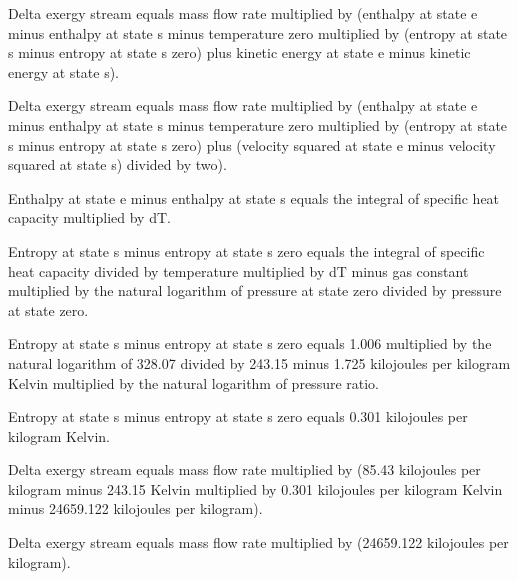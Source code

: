 Delta exergy stream equals mass flow rate multiplied by (enthalpy at state e minus enthalpy at state s minus temperature zero multiplied by (entropy at state s minus entropy at state s zero) plus kinetic energy at state e minus kinetic energy at state s).  

Delta exergy stream equals mass flow rate multiplied by (enthalpy at state e minus enthalpy at state s minus temperature zero multiplied by (entropy at state s minus entropy at state s zero) plus (velocity squared at state e minus velocity squared at state s) divided by two).  

Enthalpy at state e minus enthalpy at state s equals the integral of specific heat capacity multiplied by dT.  

Entropy at state s minus entropy at state s zero equals the integral of specific heat capacity divided by temperature multiplied by dT minus gas constant multiplied by the natural logarithm of pressure at state zero divided by pressure at state zero.  

Entropy at state s minus entropy at state s zero equals 1.006 multiplied by the natural logarithm of 328.07 divided by 243.15 minus 1.725 kilojoules per kilogram Kelvin multiplied by the natural logarithm of pressure ratio.  

Entropy at state s minus entropy at state s zero equals 0.301 kilojoules per kilogram Kelvin.  

Delta exergy stream equals mass flow rate multiplied by (85.43 kilojoules per kilogram minus 243.15 Kelvin multiplied by 0.301 kilojoules per kilogram Kelvin minus 24659.122 kilojoules per kilogram).  

Delta exergy stream equals mass flow rate multiplied by (24659.122 kilojoules per kilogram).